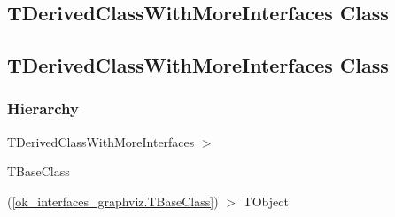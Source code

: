 \documentclass{report}
\begin{document}
\subsection*{\large{\textbf{TDerivedClassWithMoreInterfaces Class}}\normalsize\hspace{1ex}\hrulefill}
\else
\subsection*{TDerivedClassWithMoreInterfaces Class}
\fi
\label{ok_interfaces_graphviz.TDerivedClassWithMoreInterfaces}
\subsubsection*{\large{\textbf{Hierarchy}}\normalsize\hspace{1ex}\hfill}
TDerivedClassWithMoreInterfaces {$>$} \begin{ttfamily}TBaseClass\end{ttfamily}(\ref{ok_interfaces_graphviz.TBaseClass}) {$>$} 
TObject
\end{document}
